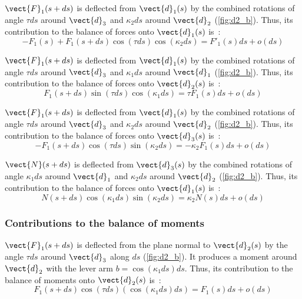 $\vect{F}_1(s+ds)$ is deflected from $\vect{d}_1(s)$ by the combined rotations of angle $\tau ds$ around $\vect{d}_3$ and $\kappa_2 ds$ around $\vect{d}_2$ (\cref{fig:d2_b}). Thus, its contribution to the balance of forces onto $\vect{d}_1(s)$ is~:
\begin{equation*}
	-F_1(s) + F_1(s+ds) \cos(\tau ds) \cos(\kappa_2 ds) = F'_1 (s) ds + o(ds)
\end{equation*}

$\vect{F}_1(s+ds)$ is deflected from $\vect{d}_1(s)$ by the combined rotations of angle $\tau ds$ around $\vect{d}_3$ and $\kappa_1 ds$ around $\vect{d}_1$ (\cref{fig:d2_b}). Thus, its contribution to the balance of forces onto $\vect{d}_2(s)$ is~:
\begin{equation*}
	F_1(s+ds) \sin(\tau ds) \cos(\kappa_1 ds) = \tau F_1 (s) ds + o(ds)
\end{equation*}

$\vect{F}_1(s+ds)$ is deflected from $\vect{d}_1(s)$ by the combined rotations of angle $\tau ds$ around $\vect{d}_3$ and $\kappa_2 ds$ around $\vect{d}_2$ (\cref{fig:d2_b}). Thus, its contribution to the balance of forces onto $\vect{d}_3(s)$ is~:
\begin{equation*}
	-F_1(s+ds) \cos(\tau ds) \sin(\kappa_2 ds) = - \kappa_2 F_1(s) ds + o(ds)
\end{equation*}

$\vect{N}(s+ds)$ is deflected from $\vect{d}_3(s)$ by the combined rotations of angle $\kappa_1 ds$ around $\vect{d}_1$ and $\kappa_2 ds$ around $\vect{d}_2$ (\cref{fig:d2_b}). Thus, its contribution to the balance of forces onto $\vect{d}_1(s)$ is~:
\begin{equation*}
	N(s+ds) \cos(\kappa_1 ds) \sin(\kappa_2 ds) = \kappa_2 N(s) ds + o(ds)
\end{equation*}

\subsubsection{Contributions to the balance of moments}

$\vect{F}_1(s+ds)$ is deflected from the plane normal to $\vect{d}_2(s)$ by the angle $\tau ds$ around $\vect{d}_3$ along $ds$ (\cref{fig:d2_b}). It produces a moment around $\vect{d}_2$ with the lever arm $b =  \cos(\kappa_1 ds) ds$. Thus, its contribution to the balance of moments onto $\vect{d}_2(s)$ is~:
\begin{equation*}
	F_1(s+ds) \cos(\tau ds) (\cos(\kappa_1 ds) ds) = F_1(s) ds + o(ds)
\end{equation*}

